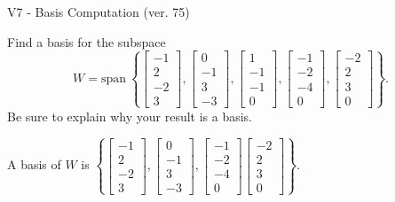 \begin{exercise}
  \begin{exerciseTitle}V7 - Basis Computation (ver. 75)\end{exerciseTitle}
  \begin{exerciseStatement}
    Find a basis for the subspace 
\[W=\mathrm{span}\ \left\{\left[\begin{array}{r}
-1 \\
2 \\
-2 \\
3
\end{array}\right] , \left[\begin{array}{r}
0 \\
-1 \\
3 \\
-3
\end{array}\right] , \left[\begin{array}{r}
1 \\
-1 \\
-1 \\
0
\end{array}\right] , \left[\begin{array}{r}
-1 \\
-2 \\
-4 \\
0
\end{array}\right] , \left[\begin{array}{r}
-2 \\
2 \\
3 \\
0
\end{array}\right]\right\}.\]
 Be sure to explain why your result is a basis.


  \end{exerciseStatement}
  \begin{exerciseAnswer}
   A basis of \(W\) is  \(\left\{\left[\begin{array}{r}
-1 \\
2 \\
-2 \\
3
\end{array}\right] , \left[\begin{array}{r}
0 \\
-1 \\
3 \\
-3
\end{array}\right] , \left[\begin{array}{r}
-1 \\
-2 \\
-4 \\
0
\end{array}\right] \left[\begin{array}{r}
-2 \\
2 \\
3 \\
0
\end{array}\right]\right\}\).
  


  \end{exerciseAnswer}
\end{exercise}
